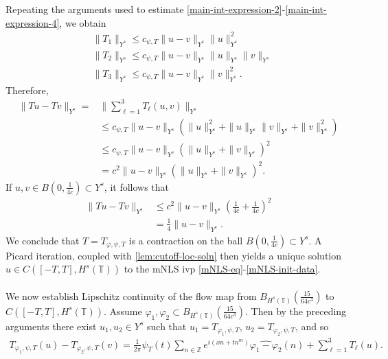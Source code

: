 \documentclass[12pt,reqno]{amsart}
\numberwithin{equation}{section}  %
\numberwithin{figure}{section}
\newcommand{\zz}{\mathbb{Z}}
\newcommand{\ci}{\mathbb{T}}
\newcommand{\wh}{\widehat}
\newcommand{\vp}{\varphi}
\theoremstyle{plain}
\theoremstyle{definition}
\theoremstyle{remark}
\begin{document}
Repeating the arguments used to estimate 
\eqref{main-int-expression-2}-\eqref{main-int-expression-4}, we obtain
%
\begin{equation*}
	\begin{split}
    & \|T_1\|_{Y^s} \le c_{\psi,T} \|u -v \|_{Y^s} \|u\|^2_{Y^s}
		\\
    & \|T_2\|_{Y^s} \le c_{\psi,T} \|u -v \|_{Y^s} \|u\|_{Y^s} \|v\|_{Y^s}
		\\
    & \|T_3\|_{Y^s} \le c_{\psi,T} \|u -v \|_{Y^s} \|v\|_{Y^s}^2.
	\end{split}
\end{equation*}
%
Therefore,
%
\begin{equation}
	\label{20a}
	\begin{split}
    \|Tu - Tv \|_{Y^s} = & \| \sum_{\ell =1}^{3} T_\ell(u, v) \|_{Y^s}
		\\
    & \le c_{\psi,T} \|u -v \|_{Y^s} \left( \|u\|_{Y^s}^2 + 
		\|u\|_{Y^s} \|v\|_{Y^s} + \|v\|_{Y^s}^2 \right)
		\\
		& \le c_{\psi,T} \|u -v\|_{Y^s} \left( \|u\|_{Y^s} + \|v\|_{Y^s} \right)^2
		\\
		& = c^2 \|u -v\|_{Y^s} \left( \|u\|_{Y^s} + \|v\|_{Y^s} \right)^2.
	\end{split}
\end{equation}
%
If $u, v \in B(0, \frac{1}{4c}) \subset Y^s$, it follows that
%
\begin{equation}
	\label{21a}
	\begin{split}
		\|Tu - Tv \|_{Y^s}
		& \le c^2 \|u -v \|_{Y^s} \left( \frac{1}{4c} + 
		\frac{1}{4c} \right)^2
		\\
		& = \frac{1}{4} \|u -v \|_{Y^s}. 
	\end{split}
\end{equation}
%
We conclude that $T = T_{\vp, \psi, T}$ is a contraction on the ball $B(0, 
\frac{1}{4c}) \subset Y^s$. A Picard iteration, coupled with
\autoref{lem:cutoff-loc-soln} then yields a unique solution $u \in C(\left[ -T,
T
\right], H^{s}(\ci))$ to the mNLS ivp \eqref{mNLS-eq}-\eqref{mNLS-init-data}.
\\
\\
We now establish Lipschitz continuity of the flow map from
$B_{H^{s}(\ci)}(\frac{15}{64c^{3}})$ to $C(\left[ -T, T \right], H^{s}(\ci))$.
Assume $\vp_1, \vp_2
\subset B_{H^s(\ci)}(\frac{15}{64c^{3}})$.
Then by the preceding arguments there exist $u_1, u_2 \in Y^s$ such that 
$u_1 = T_{\vp_1, \psi, T}$, $u_2 = T_{\vp_2, \psi, T}$, and so
%
%
\begin{equation*}
	\begin{split}
		T_{\vp_1, \psi, T}(u) -
    T_{\vp_2, \psi, T}(v) = \frac{1}{2\pi} \psi_{T}(t) \sum_{n \in
		\zz}e^{i\left( xn + tn^{m} \right)} \wh{\vp_1 - \vp_2}(n) + \sum_{\ell=1
    }^{3} T_{\ell}(u).
	\end{split}
\end{equation*}
\end{document}
